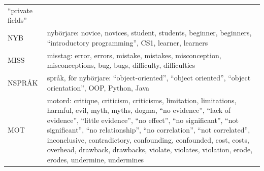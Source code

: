 \begin{longtable}{@{}>{\raggedright\arraybackslash}p{}%
  >{\raggedright\arraybackslash}p{}@{}}
    \enquote{private fields} \\
  NYB & nybörjare: novice, novices, student, students, beginner,
    beginners, \enquote{introductory programming}, CS1, learner, learners
    \\
  MISS & misstag: error, errors, mistake, mistakes, misconception,
    misconceptions, bug, bugs, difficulty, difficulties \\
  NSPRÅK & språk, för nybörjare: \enquote{object-oriented},
    \enquote{object oriented}, \enquote{object orientation}, OOP, Python,
    Java \\
  MOT & motord: critique, criticism, criticisms, limitation,
    limitations, harmful, evil, myth, myths, dogma, \enquote{no evidence},
    \enquote{lack of evidence}, \enquote{little evidence}, \enquote{no
    effect}, \enquote{no significant}, \enquote{not significant},
    \enquote{no relationship}, \enquote{no correlation}, \enquote{not
    correlated}, inconclusive, contradictory, confounding, confounded,
    cost, costs, overhead, drawback, drawbacks, violate, violates,
    violation, erode, erodes, undermine, undermines \\
\end{longtable}
\endgroup

